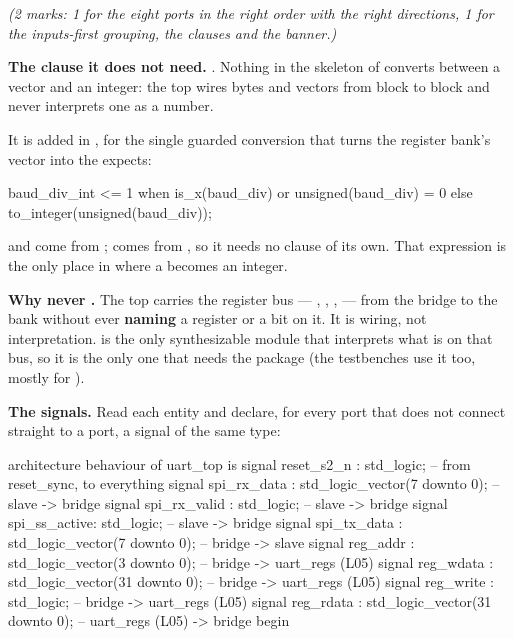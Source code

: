 {\itshape (2 marks: 1 for the eight ports in the right order with the right directions, 1 for the
inputs-first grouping, the clauses and the banner.)\par}

\medskip
\textbf{The clause it does not need.} . Nothing in the skeleton of
 converts between a vector and an integer: the top wires bytes and vectors from block to
block and never interprets one as a number.

It is added in \textbf{}, for the single guarded conversion that turns the register
bank's  vector into the   expects:

\begin{vhdlcode}
baud_div_int <= 1 when is_x(baud_div) or unsigned(baud_div) = 0
              else to_integer(unsigned(baud_div));
\end{vhdlcode}

\noindent{} and  come from ;  comes from
, so it needs no clause of its own. That expression is the only place in
 where a  becomes an integer.

\textbf{Why never .} The top carries the register bus ---
, , ,  --- from the bridge to the
bank without ever \textbf{naming} a register or a bit on it. It is wiring, not interpretation.
 is the only synthesizable module that interprets what is on that bus, so it is the
only one that needs the package (the testbenches use it too, mostly for ). 

\textbf{The signals.} Read each entity and declare, for every port that does not connect straight to
a  port, a signal of the same type:

\begin{vhdlcode}
architecture behaviour of uart_top is
signal reset_s2_n   : std_logic;                      -- from reset_sync, to everything
signal spi_rx_data  : std_logic_vector(7 downto 0);   -- slave  -> bridge
signal spi_rx_valid : std_logic;                      -- slave  -> bridge
signal spi_ss_active: std_logic;                      -- slave  -> bridge
signal spi_tx_data  : std_logic_vector(7 downto 0);   -- bridge -> slave
signal reg_addr     : std_logic_vector(3 downto 0);   -- bridge -> uart_regs (L05)
signal reg_wdata    : std_logic_vector(31 downto 0);  -- bridge -> uart_regs (L05)
signal reg_write    : std_logic;                      -- bridge -> uart_regs (L05)
signal reg_rdata    : std_logic_vector(31 downto 0);  -- uart_regs (L05) -> bridge
begin
\end{vhdlcode}

